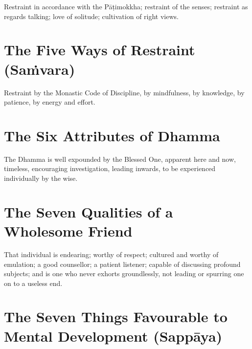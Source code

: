 Restraint in accordance with the Pāṭimokkha; restraint of the senses; restraint
as regards talking; love of solitude; cultivation of right views.


\ifhandbookedition
\vspace*{-\baselineskip}
\fi

\section*{The Five Ways of Restraint (Saṁvara)}

Restraint by the Monastic Code of Discipline, by mindfulness, by knowledge, by
patience, by energy and effort.


\ifhandbookedition
\vspace*{-\baselineskip}
\fi

\section*{The Six Attributes of Dhamma}

The Dhamma is well expounded by the Blessed One,
apparent here and now, timeless, encouraging investigation,
leading inwards, to be experienced individually by the wise.


\ifhandbookedition
\vspace*{-\baselineskip}
\fi

\section*{The Seven Qualities of a Wholesome Friend}


That individual is endearing; worthy of respect; cultured and worthy of
emulation; a good counsellor; a patient listener; capable of discussing profound
subjects; and is one who never exhorts groundlessly, not leading or spurring one
on to a useless end.


\ifhandbookedition
\vspace*{-\baselineskip}
\fi

\section*{The Seven Things Favourable to Mental Development (Sappāya)}

